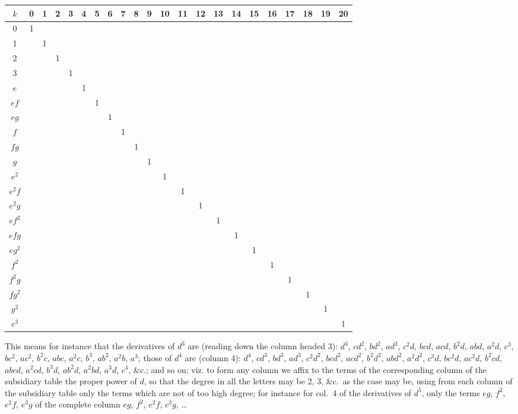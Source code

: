 \documentclass[11pt,a4paper]{book}
\begin{document}
\begin{center}
\small
\begin{tabular}{c|ccccccccccccccccccccc}
$k$ & 0 & 1 & 2 & 3 & 4 & 5 & 6 & 7 & 8 & 9 & 10 & 11 & 12 & 13 & 14 & 15 & 16 & 17 & 18 & 19 & 20\\
\midrule
0 & 1 & & & & & & & & & & & & & & & & & & & & \\
1 & & 1 & & & & & & & & & & & & & & & & & & & \\
2 & & & 1 & & & & & & & & & & & & & & & & & & \\
3 & & & & 1 & & & & & & & & & & & & & & & & & \\
$e$ & & & & & 1 & & & & & & & & & & & & & & & & \\
$ef$ & & & & & & 1 & & & & & & & & & & & & & & & \\
$eg$ & & & & & & & 1 & & & & & & & & & & & & & & \\
$f$ & & & & & & & & 1 & & & & & & & & & & & & & \\
$fg$ & & & & & & & & & 1 & & & & & & & & & & & & \\
$g$ & & & & & & & & & & 1 & & & & & & & & & & & \\
$e^2$ & & & & & & & & & & & 1 & & & & & & & & & & \\
$e^2f$ & & & & & & & & & & & & 1 & & & & & & & & & \\
$e^2g$ & & & & & & & & & & & & & 1 & & & & & & & & \\
$ef^2$ & & & & & & & & & & & & & & 1 & & & & & & & \\
$efg$ & & & & & & & & & & & & & & & 1 & & & & & & \\
$eg^2$ & & & & & & & & & & & & & & & & 1 & & & & & \\
$f^2$ & & & & & & & & & & & & & & & & & 1 & & & & \\
$f^2g$ & & & & & & & & & & & & & & & & & & 1 & & & \\
$fg^2$ & & & & & & & & & & & & & & & & & & & 1 & & \\
$g^2$ & & & & & & & & & & & & & & & & & & & & 1 & \\
$e^3$ & & & & & & & & & & & & & & & & & & & & & 1\\
\end{tabular}
\normalsize
\end{center}

This means for instance that the derivatives of $d^3$ are (reading down the column headed 3): $d^3$, $cd^2$, $bd^2$, $ad^2$, $c^2d$, $bcd$, $acd$, $b^2d$, $abd$, $a^2d$, $c^3$, $bc^2$, $ac^2$, $b^2c$, $abc$, $a^2c$, $b^3$, $ab^2$, $a^2b$, $a^3$; those of $d^4$ are (column 4): $d^4$, $cd^3$, $bd^3$, $ad^3$, $c^2d^2$, $bcd^2$, $acd^2$, $b^2d^2$, $abd^2$, $a^2d^2$, $c^3d$, $bc^2d$, $ac^2d$, $b^2cd$, $abcd$, $a^2cd$, $b^3d$, $ab^2d$, $a^2bd$, $a^3d$, $c^4$, \&c.; and so on; viz. to form any column we affix to the terms of the corresponding column of the subsidiary table the proper power of $d$, so that the degree in all the letters may be 2, 3, \&c.\ as the case may be, using from each column of the subsidiary table only the terms which are not of too high degree; for instance for col.~4 of the derivatives of $d^5$, only the terms $eg$, $f^2$, $e^2f$, $e^3g$ of the complete column $eg$, $f^2$, $e^2f$, $e^3g$, \ldots
\end{document}
